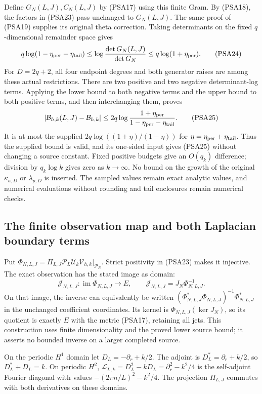 \documentclass{article}
\begin{document}
Define $G_N(L,J),C_N(L,J)$ by (PSA17) using this finite Gram.
By (PSA18), the factors in (PSA23) pass unchanged to $G_N(L,J)$.
The same proof of (PSA19) supplies its original theta correction.
Taking determinants on the fixed $q$-dimensional remainder space gives
\[
 q\log(1-\eta_{\rm per}-\eta_{\rm tail})
 \le\log\frac{\det G_N(L,J)}{\det G_N}
 \le q\log(1+\eta_{\rm per}).
 \tag{PSA24}
\]
For $D=2q+2$, all four endpoint degrees and both generator raises
are among these actual restrictions. There are two positive and two
negative determinant-log terms. Applying the lower bound to both
negative terms and the upper bound to both positive terms, and then
interchanging them, proves
\[
 \left|\mathcal B_{h,k}(L,J)-\mathcal B_{h,k}\right|
 \le2q\log\frac{1+\eta_{\rm per}}
                         {1-\eta_{\rm per}-\eta_{\rm tail}}.
 \tag{PSA25}
\]
It is at most the supplied
$2q\log((1+\eta)/(1-\eta))$ for
$\eta=\eta_{\rm per}+\eta_{\rm tail}$. Thus the supplied bound is
valid, and its one-sided input gives (PSA25) without changing a source
constant. Fixed positive budgets give an $O(q_k)$ difference; division
by $q_k\log k$ gives zero as $k\to\infty$. No bound on the growth of
the original $\kappa_{a,D}$ or $\lambda_{p,D}$ is inserted. The
sampled values remain exact analytic values, and numerical evaluations
without rounding and tail enclosures remain numerical checks.

\subsection{The finite observation map and both Laplacian boundary terms}

Put $\Phi_{N,L,J}=\Pi_{L,J}\mathcal P_L\mathcal U_k
\mathcal V_{h,k}|_{\mathcal P_N}$. Strict positivity in (PSA23)
makes it injective. The exact observation has the stated image as
domain:
\[
 \mathcal J_{N,L,J}:\operatorname{im}\Phi_{N,L,J}\longrightarrow E,
 \qquad
 \mathcal J_{N,L,J}=J_N\Phi_{N,L,J}^{-1}.
 \tag{PSA26}
\]
On that image, the inverse can equivalently be written
$(\Phi_{N,L,J}^*\Phi_{N,L,J})^{-1}\Phi_{N,L,J}^*$ in the unchanged
coefficient coordinates. Its kernel is
$\Phi_{N,L,J}(\ker J_N)$, so its quotient is exactly $E$ with the
metric (PSA17), retaining all jets. This construction uses finite
dimensionality and the proved lower source bound; it asserts no
bounded inverse on a larger completed source.

On the periodic $H^1$ domain let $D_L=-\partial_r+k/2$.
The adjoint is $D_L^*=\partial_r+k/2$, so $D_L^*+D_L=k$.
On periodic $H^2$, $\mathscr L_{L,k}=D_L^2-kD_L
=\partial_r^2-k^2/4$ is the self-adjoint Fourier diagonal with
values $-(2\pi n/L)^2-k^2/4$. The projection $\Pi_{L,J}$ commutes
with both derivatives on these domains.
\end{document}
